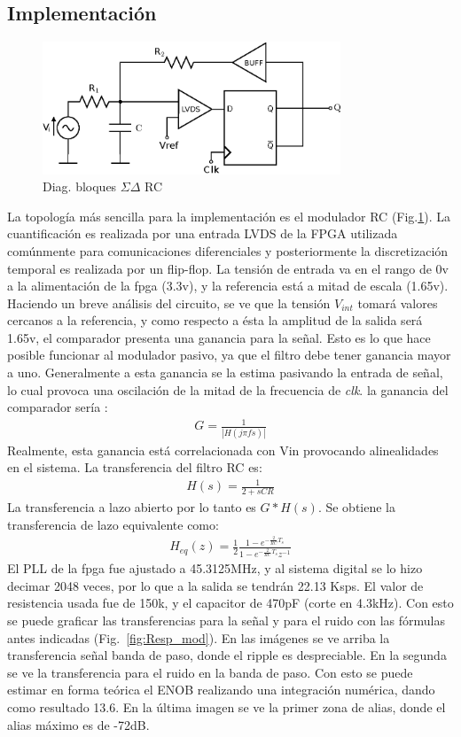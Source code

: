 \documentclass[a4paper,conference]{IEEEtran}
\begin{document}
\subsection{Implementaci\'on}

\begin{figure}[!b]
\centering
\includegraphics[width=3.5in]{Sigma-Delta_RC}
\caption{Diag. bloques $\Sigma\Delta$ RC}
\label{fig_SDRC}
\end{figure}

La topolog\'ia m\'as sencilla para la implementaci\'on es el modulador RC (Fig.\ref{fig_SDRC}). La cuantificaci\'on es realizada por una entrada LVDS de la FPGA\cite{Sp6-IO} utilizada com\'unmente para comunicaciones diferenciales y posteriormente la discretizaci\'on temporal es realizada por un flip-flop. La tensi\'on de entrada va en el rango de 0v a la alimentación de la fpga (3.3v), y la referencia está a mitad de escala (1.65v).  Haciendo un breve an\'alisis del circuito, se ve que la tensi\'on $V_{int}$ tomar\'a valores cercanos a la referencia, y como respecto a \'esta la amplitud de la salida ser\'a 1.65v, el comparador presenta una ganancia para la se\~nal. Esto es lo que hace posible funcionar al modulador pasivo, ya que el filtro debe tener ganancia mayor a uno. Generalmente a esta ganancia se la estima pasivando la entrada de señal, lo cual provoca una oscilación de la mitad de la frecuencia de \textit{clk}. la ganancia del comparador ser\'ia :
\begin{align}
G=\frac{1}{|H(j\pi fs)|}
\end{align}
Realmente, esta ganancia está correlacionada con Vin provocando alinealidades en el sistema. La transferencia del filtro RC es:
\begin{align}
H(s)=\frac{1}{2+sCR}
\end{align}
La transferencia a lazo abierto por lo tanto es $G*H(s)$. 
Se obtiene la transferencia de lazo equivalente como:
\begin{align}
H_{eq}(z)=\frac{1}{2}\frac{1-e^{-\frac{2}{RC}T_s}}{1-e^{-\frac{2}{RC}T_s}z^{-1}}
\end{align}
El PLL de la fpga fue ajustado a 45.3125MHz, y al sistema digital se lo hizo decimar 2048 veces, por lo que a la salida se tendrán 22.13 Ksps. El valor de resistencia usada fue de 150k, y el capacitor de 470pF (corte en 4.3kHz).
Con esto se puede graficar las transferencias para la señal y para el ruido con las fórmulas antes indicadas (Fig.~\ref{fig:Resp_mod}). En las im\'agenes se ve arriba la transferencia se\~nal banda de paso, donde el ripple es despreciable. En la segunda se ve la transferencia para el ruido en la banda de paso. Con esto se puede estimar en forma te\'orica el ENOB realizando una integraci\'on num\'erica, dando como resultado 13.6. En la \'ultima imagen se ve la primer zona de alias, donde el alias m\'aximo es de -72dB.
\end{document}
